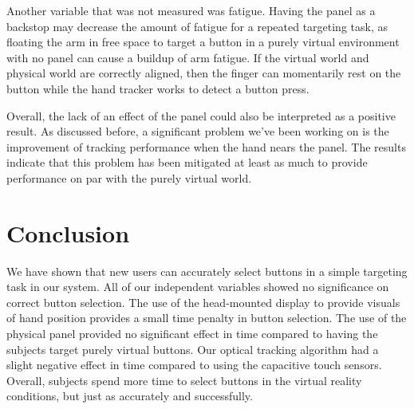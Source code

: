 Another variable that was not measured was fatigue.
Having the panel as a backstop may decrease the amount of fatigue for a repeated targeting task, as floating the arm in free space to target a button in a purely virtual environment with no panel can cause a buildup of arm fatigue.
If the virtual world and physical world are correctly aligned, then the finger can momentarily rest on the button while the hand tracker works to detect a button press.

Overall, the lack of an effect of the panel could also be interpreted as a positive result.
As discussed before, a significant problem we've been working on is the improvement of tracking performance when the hand nears the panel.
The results indicate that this problem has been mitigated at least as much to provide performance on par with the purely virtual world.

\section{Conclusion}


We have shown that new users can accurately select buttons in a simple targeting task in our system.
All of our independent variables showed no significance on correct button selection.
The use of the head-mounted display to provide visuals of hand position provides a small time penalty in button selection.
The use of the physical panel provided no significant effect in time compared to having the subjects target purely virtual buttons.
Our optical tracking algorithm had a slight negative effect in time compared to using the capacitive touch sensors.
Overall, subjects spend more time to select buttons in the virtual reality conditions, but just as accurately and successfully.

